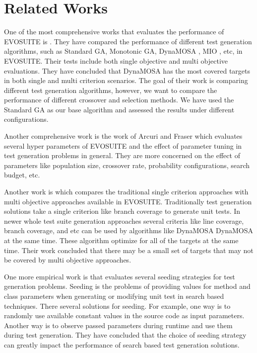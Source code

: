 \documentclass[sigconf]{acmart}
\begin{document}
\section{Related Works}
\label{relatedworks}
One of the most comprehensive works that evaluates the performance of EVOSUITE is \cite{CAMPOS2018207}. They have
compared the performance of different test generation algorithms, such as Standard GA, Monotonic GA, 
DynaMOSA \cite{7840029}, MIO \cite{Arcuri_2017}, etc, in EVOSUITE. 
Their tests include both single objective and multi objective evaluations. They have concluded that
DynaMOSA has the most covered targets in both single and multi criterion scenarios. The goal of their work is
comparing different test generation algorithms, however, we want to compare the performance of different crossover
and selection methods. We have used the Standard GA as our base algorithm and assessed the results under different
configurations.

Another comprehensive work is the work of Arcuri and Fraser \cite{Tuning13} which evaluates several 
hyper parameters of EVOSUITE and the effect of parameter tuning in test generation problems in general.
They are more concerned on the effect of parameters like population size, crossover rate, probability
configurations, search budget, etc. 

Another work is \cite{emse16_effectiveness} which compares the traditional single criterion approaches
with multi objective approaches available in EVOSUITE. Traditionally test generation solutions take
a single criterion like branch coverage to generate unit tests. In newer whole test suite generation 
approaches several criteria like line coverage, branch coverage, and etc can be used by algorithms 
like DynaMOSA DynaMOSA \cite{7840029} at the same time. 
These algorithm optimize for all of the targets at the same time. Their work concluded
that there may be a small set of targets that may not be covered by multi objective approaches.

One more empirical work is \cite{STVR_seeding} that evaluates several seeding strategies for test generation
problems. Seeding is the problems of providing values for method and class parameters when generating or
modifying unit test in search based techniques. There several solutions for seeding. For example, 
one way is to randomly use available constant values in the source code as input parameters.
Another way is to observe passed parameters during runtime and use them during test generation. They have concluded 
that the choice of seeding strategy can greatly impact the performance of search based test generation solutions.
\end{document}
